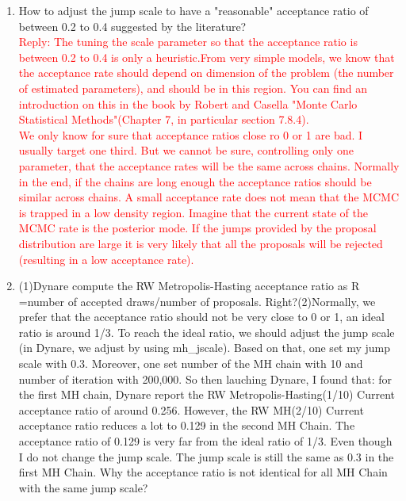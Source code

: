 \documentclass[10pt,math=newtx,citestyle=gb7714-2015,bibstyle=gb7714-2015]{elegantbook}
\begin{document}
{{{\begin{enumerate}
{\begin{itemize}
				\item It works quite well in practice. Anything in the range of 20 to 30 percent should be ok!
			\end{itemize}
		}
		\item How to adjust the jump scale to have a "reasonable" acceptance ratio of between 0.2 to 0.4 suggested by the literature?\\
		\textcolor{red}{Reply: The tuning the scale parameter so that the acceptance ratio is between 0.2 to 0.4 is only a heuristic.From very simple models, we know that the acceptance rate should depend on dimension of the problem (the number of estimated parameters), and should be in this region. You can find an introduction on this in the book by Robert and Casella "Monte Carlo Statistical Methods"(Chapter 7, in particular section 7.8.4).\\
			We only know for sure that acceptance ratios close ro 0 or 1 are bad. I usually target one third. But we cannot be sure, controlling only one parameter, that the acceptance rates will be the same across chains. Normally in the end, if the chains are long enough the acceptance ratios should be similar across chains. A small acceptance rate does not mean that the MCMC is trapped in a low density region. Imagine that the current state of the MCMC rate is the posterior mode. If the jumps provided by the proposal distribution are large it is very likely that all the proposals will be rejected (resulting in a low acceptance rate).}
		\item (1)Dynare compute the RW Metropolis-Hasting acceptance ratio as R =number of accepted draws/number of proposals. Right?(2)Normally, we prefer that the acceptance ratio should not be very close to 0 or 1, an ideal ratio is around 1/3. To reach the ideal ratio, we should adjust the jump scale (in Dynare, we adjust by using mh\_jscale). Based on that, one set my jump scale with 0.3. Moreover, one set number of the MH chain with 10 and number of iteration with 200,000. So then lauching Dynare, I found that: for the first MH chain, Dynare report the RW Metropolis-Hasting(1/10) Current acceptance ratio of around 0.256. However, the RW MH(2/10) Current acceptance ratio reduces a lot to 0.129 in the second MH Chain. The acceptance ratio of 0.129 is very far from the ideal ratio of 1/3. Even though I do not change the jump scale. The jump scale is still the same as 0.3 in the first MH Chain. Why the acceptance ratio is not identical for all MH Chain with the same jump scale?\\

\end{enumerate}}}}
\end{document}

